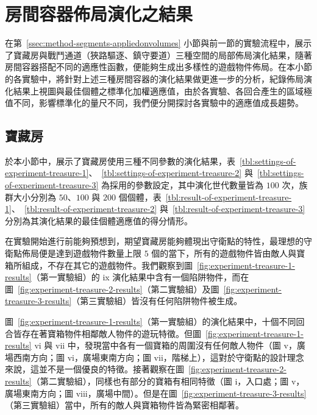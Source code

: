 \section{房間容器佈局演化之結果}
\label{sec:experiment-results}

在第~\ref{ssec:method-segments-appliedonvolumes} 小節與前一節的實驗流程中，展示了寶藏房與戰鬥通道（狹路驅逐、鎮守要道）三種空間的局部佈局演化結果，隨著房間容器搭配不同的適應性函數，便能夠生成出多樣性的遊戲物件佈局。在本小節的各實驗中，將針對上述三種房間容器的演化結果做更進一步的分析，紀錄佈局演化結果上視圖與最佳個體之標準化加權適應值，由於各實驗、各回合產生的區域極值不同，影響標準化的量尺不同，我們便分開探討各實驗中的適應值成長趨勢。


\subsection{寶藏房}
\label{ssec:experiment-results-treasure}

於本小節中，展示了寶藏房使用三種不同參數的演化結果，表~\ref{tbl:settings-of-experiment-treasure-1}、~\ref{tbl:settings-of-experiment-treasure-2} 與~\ref{tbl:settings-of-experiment-treasure-3} 為採用的參數設定，其中演化世代數量皆為 $100$ 次，族群大小分別為 $50$、$100$ 與 $200$ 個個體，表~\ref{tbl:result-of-experiment-treasure-1}、~\ref{tbl:result-of-experiment-treasure-2} 與~\ref{tbl:result-of-experiment-treasure-3} 分別為其演化結果的最佳個體適應值的得分情形。

在實驗開始進行前能夠預想到，期望寶藏房能夠體現出守衛點的特性，最理想的守衛點佈局便是達到遊戲物件數量上限 $5$ 個的當下，所有的遊戲物件皆由敵人與寶箱所組成，不存在其它的遊戲物件。我們觀察到圖~\ref{fig:experiment-treasure-1-results}（第一實驗組）的 ix 演化結果中含有一個陷阱物件，而在圖~\ref{fig:experiment-treasure-2-results}（第二實驗組）及圖~\ref{fig:experiment-treasure-3-results}（第三實驗組）皆沒有任何陷阱物件被生成。

圖~\ref{fig:experiment-treasure-1-results}（第一實驗組）的演化結果中，十個不同回合皆存在著寶箱物件相鄰敵人物件的遊玩特徵。但圖~\ref{fig:experiment-treasure-1-results} vi 與 vii 中，發現當中各有一個寶箱的周圍沒有任何敵人物件（圖 v，廣場西南方向；圖 vi，廣場東南方向；圖 vii，階梯上），這對於守衛點的設計理念來說，這並不是一個優良的特徵。接著觀察在圖~\ref{fig:experiment-treasure-2-results}（第二實驗組），同樣也有部分的寶箱有相同特徵（圖 i，入口處；圖 v，廣場東南方向；圖 viii，廣場中間）。但是在圖~\ref{fig:experiment-treasure-3-results} （第三實驗組）當中，所有的敵人與寶箱物件皆為緊密相鄰著。

